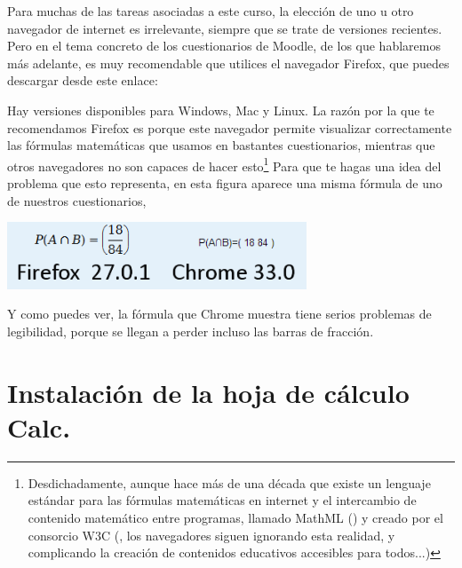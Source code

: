 \documentclass[10pt,a4paper]{article}\usepackage[]{graphicx}\usepackage[]{color}
\newcounter {cont01}
\begin{document}
Para muchas de las tareas asociadas a este curso, la elección de uno u otro navegador de internet
es irrelevante, siempre que se trate de versiones recientes. Pero en el tema concreto de los
cuestionarios de Moodle, de los que hablaremos más adelante, es muy recomendable que utilices el
navegador Firefox, que puedes descargar desde  este enlace:
\begin{center}
\end{center}
Hay versiones disponibles para Windows, Mac y Linux. La razón por la que te recomendamos Firefox es
porque este navegador permite visualizar correctamente las fórmulas matemáticas que usamos en
bastantes cuestionarios, mientras que otros navegadores no son capaces de hacer esto\footnote{
Desdichadamente, aunque hace más de una década que existe un lenguaje estándar para las fórmulas
matemáticas en internet y el intercambio de contenido matemático entre programas, llamado MathML
() y creado por el
consorcio W3C (, los
navegadores siguen ignorando esta realidad, y complicando la creación de contenidos educativos
accesibles para todos...) } Para que te hagas una idea del problema que esto representa, en esta
figura aparece una misma fórmula de uno de nuestros cuestionarios,
    \begin{center}
    \includegraphics[height=2cm]{../fig/Tut00-SoporteMathMLNavegadores.png}
    \end{center}
Y como puedes ver, la fórmula que Chrome muestra tiene serios problemas de legibilidad, porque se
llegan a perder incluso las barras de fracción.


\section{Instalación de la hoja de cálculo Calc.}
\label{tut00:sec:InstalacionCalc}
\end{document}
